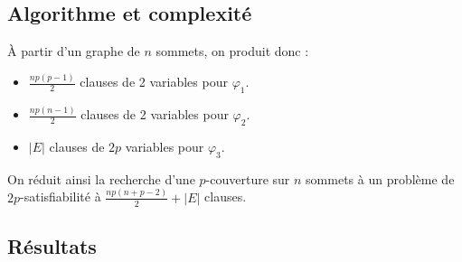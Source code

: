 \documentclass[a4paper,10pt]{article}
\newcommand*{\itemb}{\item[$\bullet$]}
\begin{document}
\subsection{Algorithme et complexité}

À partir d'un graphe de $n$ sommets, on produit donc :
\begin{itemize}
 \itemb $\frac{np(p-1)}2$ clauses de 2 variables pour $\varphi_1$.
 \itemb $\frac{np(n-1)}2$ clauses de 2 variables pour $\varphi_2$.
 \itemb $|E|$ clauses de $2p$ variables pour $\varphi_3$.
\end{itemize}

On réduit ainsi la recherche d'une $p$-couverture sur $n$ sommets à un problème de $2p$-satisfiabilité à $\frac {np (n+p-2)}2 +|E|$ clauses.

\subsection{Résultats}
\end{document}
